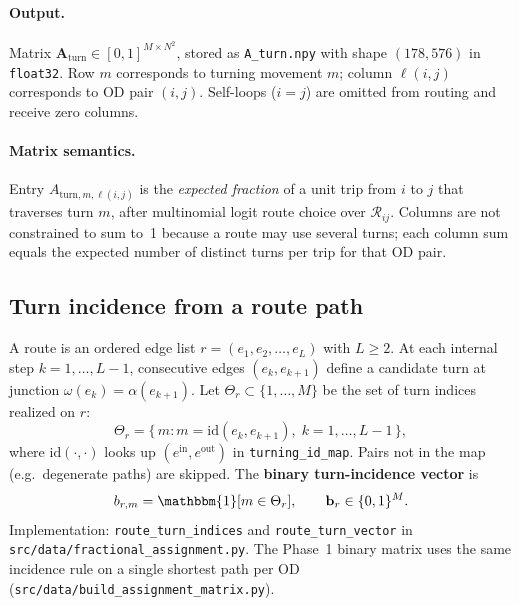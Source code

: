 \documentclass[11pt,a4paper]{report}
\newcommand{\Aturn}{\mathbf{A}_{\mathrm{turn}}}
\begin{document}
\paragraph{Output.}
Matrix $\Aturn\in[0,1]^{M\times N^2}$, stored as \texttt{A\_turn.npy} with shape $(178,576)$ in \texttt{float32}. Row $m$ corresponds to turning movement $m$; column $\ell(i,j)$ corresponds to OD pair $(i,j)$. Self-loops ($i=j$) are omitted from routing and receive zero columns.

\paragraph{Matrix semantics.}
Entry $A_{\mathrm{turn},m,\ell(i,j)}$ is the \emph{expected fraction} of a unit trip from $i$ to $j$ that traverses turn $m$, after multinomial logit route choice over $\mathcal{R}_{ij}$. Columns are not constrained to sum to~1 because a route may use several turns; each column sum equals the expected number of distinct turns per trip for that OD pair.


\subsection{Turn incidence from a route path}
\label{sec:ch2-turn-incidence}

A route is an ordered edge list $r=(e_1,e_2,\ldots,e_L)$ with $L\ge 2$. At each internal step $k=1,\ldots,L-1$, consecutive edges $(e_k,e_{k+1})$ define a candidate turn at junction $\omega(e_k)=\alpha(e_{k+1})$. Let $\Theta_r\subset\{1,\ldots,M\}$ be the set of turn indices realized on $r$:
\begin{equation}
    \Theta_r = \bigl\{\, m : m = \mathrm{id}(e_k,e_{k+1}),\; k=1,\ldots,L-1 \,\bigr\},
    \label{eq:turn_set}
\end{equation}
where $\mathrm{id}(\cdot,\cdot)$ looks up $(e^{\mathrm{in}},e^{\mathrm{out}})$ in \texttt{turning\_id\_map}. Pairs not in the map (e.g.\ degenerate paths) are skipped. The \textbf{binary turn-incidence vector} is
\begin{equation}
    b_{r,m} = \mathbbm{1}[m\in\Theta_r], \qquad \mathbf{b}_r\in\{0,1\}^M.
    \label{eq:turn_vector}
\end{equation}
Implementation: \texttt{route\_turn\_indices} and \texttt{route\_turn\_vector} in \texttt{src/data/fractional\_assignment.py}. The Phase~1 binary matrix uses the same incidence rule on a single shortest path per OD (\texttt{src/data/build\_assignment\_matrix.py}).
\end{document}

